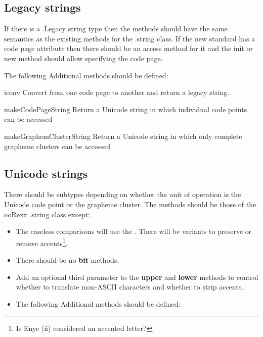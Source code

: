 \documentclass[b4paper]{article}
\begin{document}
\subsection{Legacy strings}

If there is a .Legacy string type then the methods should have the
same semantics as the existing methods for the .string class.
If the new standard has a code page attribute then there should be an
access method for it and the init or new method should allow
specifying the code page.

The following Additional methods should be defined:
\begin{definition}
\item [iconv] %
Convert from one code page to another and return a legacy string.
\item [makeCodePageString] %
Return a Unicode string in which individual code points can be accessed
\item [makeGraphemClusterString] %
Return a Unicode string in which only complete grapheme clusters can be accessed
\end{definition}

\subsection{Unicode strings}

There should be subtypes depending on whether the
unit of operation is the Unicode code point or the grapheme cluster.
The methods should be those of the ooRexx .string class except:
\begin{itemize}
\item
The caseless comparisons will use the \cite{UCD}.
There will be variants to preserve or remove accents\footnote{Is Enye (\~n) considered an accented letter?}.
\item There should be no \textbf{bit\textellipsis} methods.
\item Add an optional third parameter to the \textbf{upper} and \textbf{lower} methods
to control whether to translate mon-ASCII characters and whether to strip accents.
\item
The following Additional methods should be defined:
\end{itemize}
\end{document}
